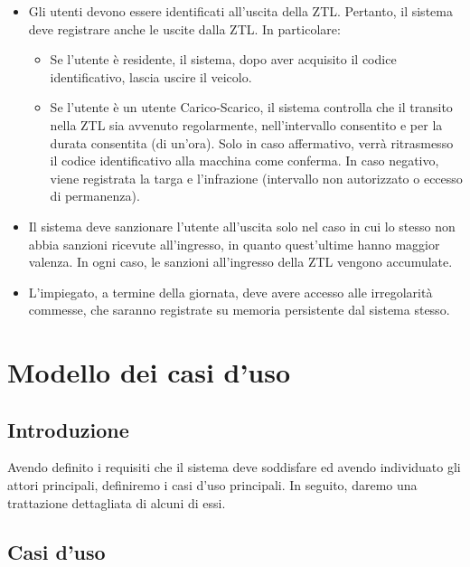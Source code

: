 \documentclass[12pt, letterpaper]{article}
\begin{document}
\begin{itemize}
\begin{itemize}
    \end{itemize}
    \item Gli utenti devono essere identificati all'uscita della ZTL. Pertanto, il sistema deve registrare anche le uscite dalla ZTL. In particolare:
    \begin{itemize}
        \item Se l'utente è residente, il sistema, dopo aver acquisito il codice identificativo, lascia uscire il veicolo.
        \item Se l'utente è un utente Carico-Scarico, il sistema controlla che il transito nella ZTL sia avvenuto regolarmente, nell'intervallo consentito e per la durata consentita (di un'ora). Solo in caso affermativo, verrà ritrasmesso il codice identificativo alla macchina come conferma. In caso negativo, viene registrata la targa e l'infrazione (intervallo non autorizzato o eccesso di permanenza). 
    \end{itemize}    
    \item Il sistema deve sanzionare l'utente all'uscita solo nel caso in cui lo stesso non abbia sanzioni ricevute all'ingresso, in quanto quest'ultime hanno maggior valenza. In ogni caso, le sanzioni all'ingresso della ZTL vengono accumulate.
    \item L'impiegato, a termine della giornata, deve avere accesso alle irregolarità commesse, che saranno registrate su memoria persistente dal sistema stesso.
\end{itemize}

\section{Modello dei casi d'uso}

\subsection{Introduzione}
Avendo definito i requisiti che il sistema deve soddisfare ed avendo individuato gli attori principali, definiremo i casi d'uso principali.
In seguito, daremo una trattazione dettagliata di alcuni di essi.

\subsection{Casi d'uso}
\end{document}
